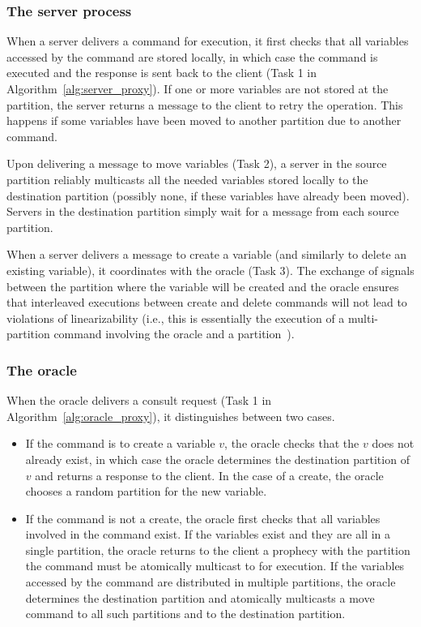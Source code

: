 \subsubsection{The server process} 

When a server delivers a command for execution, it first checks that all variables accessed by the command are stored locally, in which case the command is executed and the response is sent back to the client (Task 1 in Algorithm~\ref{alg:server_proxy}).
If one or more variables are not stored at the partition, the server returns a message to the client to retry the operation.
This happens if some variables have been moved to another partition due to another command. 

Upon delivering a message to move variables (Task 2), a server in the source partition reliably multicasts all the needed variables stored locally to the destination partition (possibly none, if these variables have already been moved).
Servers in the destination partition simply wait for a message from each source partition.

When a server delivers a message to create a variable (and similarly to delete an existing variable), it coordinates with the oracle (Task 3).
The exchange of signals between the partition where the variable will be created and the oracle ensures that interleaved executions between create and delete commands will not lead to violations of linearizability (i.e., this is essentially the execution of a multi-partition command involving the oracle and a partition~\cite{bezerra2014ssmr}).

\subsubsection{The oracle} 

When the oracle delivers a consult request (Task 1 in Algorithm~\ref{alg:oracle_proxy}), it distinguishes between two cases.
\begin{itemize}
\item If the command is to create a variable $v$, the oracle checks that the $v$ does not already exist, in which case the oracle determines the destination partition of $v$ and returns a response to the client.
In the case of a create, the oracle chooses a random partition for the new variable.
\item If the command is not a create, the oracle first checks that all variables involved in the command exist.
If the variables exist and they are all in a single partition, the oracle returns to the client a prophecy with the partition the command must be atomically multicast to for execution.
If the variables accessed by the command are distributed in multiple partitions, the oracle determines the destination partition and atomically multicasts a move command to all such partitions and to the destination partition.
\end{itemize}

